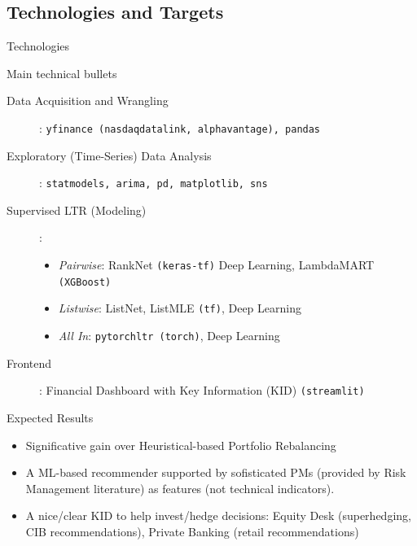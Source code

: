 \documentclass[ucs,8pt,handout]{beamer}
\begin{document}
\subsection{Technologies and Targets}
\begin{frame}{Technologies}
  \begin{block}{Main technical bullets}
    \begin{description}
    \item[Data Acquisition and Wrangling]: {\tt yfinance
      (nasdaqdatalink, alphavantage), pandas} 
    \item[Exploratory (Time-Series) Data Analysis]: {\tt statmodels,
      arima, pd, matplotlib, sns}
    \item[Supervised LTR (Modeling)]:
      \begin{itemize}
      \item {\sl Pairwise}:  {\sc RankNet} {\tt (keras-tf)} Deep Learning,
        {\sc LambdaMART} {\tt (XGBoost)} 
      \item {\sl Listwise}: {\sc ListNet, ListMLE} {\tt (tf)}, Deep Learning
      \item {\sl All In}: {\tt pytorchltr (torch)}, Deep Learning
      \end{itemize}
      
    \item[Frontend]: Financial Dashboard with Key Information (KID) {\tt (streamlit)}
    \end{description}
  \end{block}

  \begin{block}{Expected Results}
    \begin{itemize}
    \item Significative gain over Heuristical-based Portfolio Rebalancing
    \item A ML-based recommender supported by sofisticated PMs
      (provided by Risk Management literature) as features (not technical indicators). 
    \item A nice/clear KID to help invest/hedge decisions: Equity Desk
        (superhedging, CIB recommendations), Private Banking (retail recommendations) 
    \end{itemize}
  \end{block}
\end{frame}
\end{document}
